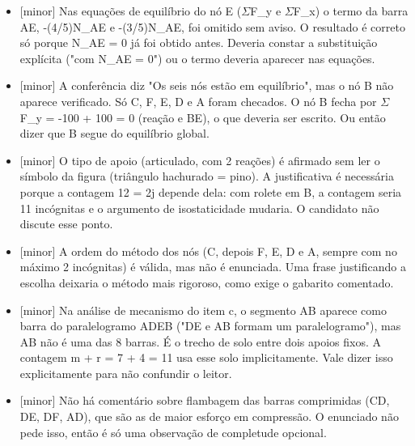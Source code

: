 \documentclass{article}%
\begin{document}
\begin{itemize}%
\item%
{[}minor{]} Nas equações de equilíbrio do nó E ($\Sigma$F\_y e $\Sigma$F\_x) o termo da barra AE, -(4/5)N\_AE e -(3/5)N\_AE, foi omitido sem aviso. O resultado é correto só porque N\_AE = 0 já foi obtido antes. Deveria constar a substituição explícita ("com N\_AE = 0") ou o termo deveria aparecer nas equações.%
\item%
{[}minor{]} A conferência diz "Os seis nós estão em equilíbrio", mas o nó B não aparece verificado. Só C, F, E, D e A foram checados. O nó B fecha por $\Sigma$F\_y = -100 + 100 = 0 (reação e BE), o que deveria ser escrito. Ou então dizer que B segue do equilíbrio global.%
\item%
{[}minor{]} O tipo de apoio (articulado, com 2 reações) é afirmado sem ler o símbolo da figura (triângulo hachurado = pino). A justificativa é necessária porque a contagem 12 = 2j depende dela: com rolete em B, a contagem seria 11 incógnitas e o argumento de isostaticidade mudaria. O candidato não discute esse ponto.%
\item%
{[}minor{]} A ordem do método dos nós (C, depois F, E, D e A, sempre com no máximo 2 incógnitas) é válida, mas não é enunciada. Uma frase justificando a escolha deixaria o método mais rigoroso, como exige o gabarito comentado.%
\item%
{[}minor{]} Na análise de mecanismo do item c, o segmento AB aparece como barra do paralelogramo ADEB ("DE e AB formam um paralelogramo"), mas AB não é uma das 8 barras. É o trecho de solo entre dois apoios fixos. A contagem m + r = 7 + 4 = 11 usa esse solo implicitamente. Vale dizer isso explicitamente para não confundir o leitor.%
\item%
{[}minor{]} Não há comentário sobre flambagem das barras comprimidas (CD, DE, DF, AD), que são as de maior esforço em compressão. O enunciado não pede isso, então é só uma observação de completude opcional.%
\end{itemize}%
\end{document}
